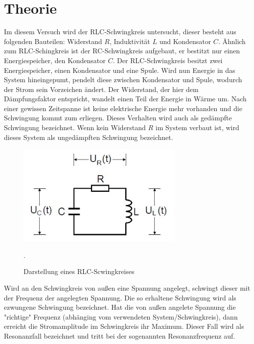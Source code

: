\section{Theorie}
Im diesem Versuch wird der RLC-Schwingkreis untersucht, dieser besteht aus folgenden
Bauteilen: Widerstand $R$, Induktivität $L$ und Kondensator $C$.
Ähnlich zum RLC-Schingkreis ist der RC-Schwingkreis aufgebaut, er bestitzt nur einen
Energiespeicher, den Kondensator $C$.
Der RLC-Schwingkreis besitzt zwei Energiespeicher, einen Kondensator und eine
Spule. Wird nun Energie in das System hineingepumt, pendelt diese zwischen Kondensator und
Spule, wodurch der Strom sein Vorzeichen ändert. Der Widerstand, der hier dem
Dämpfungsfaktor entspricht, wandelt einen Teil der Energie in Wärme um. Nach einer
gewissen Zeitspanne ist keine elektrische Energie mehr vorhanden und die Schwingung
kommt zum erliegen. Dieses Verhalten wird auch als gedämpfte Schwingung bezeichnet.
Wenn kein Widerstand $R$ im System verbaut ist, wird dieses System als
ungedämpften Schwingung bezeichnet.
\begin{figure}[H]
  \centering
  \includegraphics[height=5cm]{RLC.JPG}
  \caption{Darstellung eines RLC-Scwingkreises}
  \cite{skript}.
  \label{fig:RLC}
\end{figure}
Wird an den Schwingkreis von außen eine Spannung angelegt, schwingt dieser
mit der Frequenz der angelegten Spannung. Die so erhaltene Schwingung wird als
ezwungene Schwingung bezeichnet. Hat die von außen angelete Spannung die "richtige"
Frequenz (abhänging vom verwendeten System/Schwingkreis), dann erreicht die Stromamplitude im
Schwingkreis ihr Maximum. Dieser Fall wird als Resonanzfall bezeichnet und tritt bei der
sogenannten Resonanzfrequenz auf.

